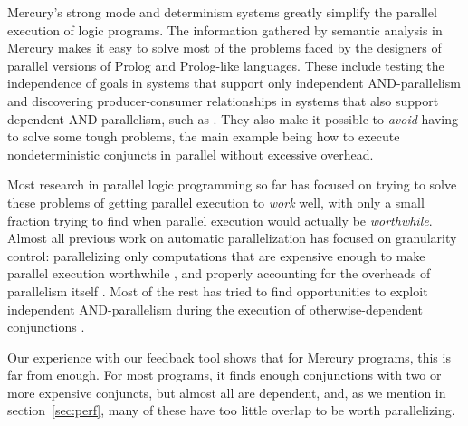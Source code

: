 Mercury's strong mode and determinism systems
greatly simplify the parallel execution of logic programs.
The information gathered by semantic analysis in Mercury
makes it easy to solve most of the problems faced by the
designers of parallel versions of Prolog and Prolog-like languages.
These include testing the independence of goals
in systems that support only independent AND-parallelism
and discovering producer-consumer relationships
in systems that also support dependent AND-parallelism,
such as \cite{DBLP:journals/tcs/GrasH09}.
They also make it possible to \emph{avoid} having to solve some tough problems,
the main example being how to execute nondeterministic conjuncts in parallel
without excessive overhead.


Most research in parallel logic programming so far
has focused on trying to solve these problems
of getting parallel execution to \emph{work} well,
with only a small fraction trying to find
when parallel execution would actually be \emph{worthwhile}.
Almost all previous work on automatic parallelization 
has focused on granularity control:
parallelizing only computations that are expensive enough
to make parallel execution
worthwhile \cite{harris_07_feedback_imp_par,lopez96:distance_granularity},
and properly accounting for the overheads
of parallelism itself \cite{shen_98_granularity-control}.
Most of the rest has tried to find opportunities
to exploit independent AND-parallelism
during the execution of otherwise-dependent conjunctions
\cite{DBLP:journals/jlp/MuthukumarBBH99,DBLP:conf/lopstr/CasasCH07}.

Our experience with our feedback tool shows that
for Mercury programs, this is far from enough.
For most programs,
it finds enough conjunctions with two or more expensive conjuncts,
but almost all are dependent,
and, as we mention in section~\ref{sec:perf},
many of these have too little overlap to be worth parallelizing.

